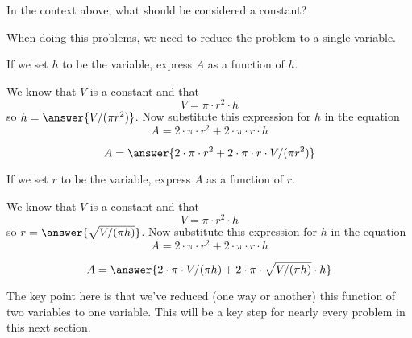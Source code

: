 \documentclass{ximera}
\begin{document}
\begin{problem}
  In the context above, what should be considered a constant?
  \begin{multipleChoice}
  \end{multipleChoice}
\end{problem}

When doing this problems, we need to reduce the problem to a single
variable.

\begin{problem}
  If we set $h$ to be the variable, express $A$ as a function of $h$.
  \begin{hint}
    We know that $V$ is a constant and that
    \[
    V = \pi \cdot r^2 \cdot h
    \]
    so $h=\answer{V/(\pi r^2)}$.
    Now substitute this expression for $h$ in the equation
    \[
  A = 2\cdot \pi \cdot r^2 + 2\cdot\pi \cdot r \cdot h
    \]
  \end{hint}
  \begin{prompt}
    \[
    A = \answer{2\cdot \pi \cdot r^2 + 2\cdot\pi \cdot r\cdot V/(\pi r^2)}
    \]
  \end{prompt}
\end{problem}

\begin{problem}
  If we set $r$ to be the variable, express $A$ as a function of $r$.
  \begin{hint}
    We know that $V$ is a constant and that
    \[
    V = \pi \cdot r^2 \cdot h
    \]
    so $r=\answer{\sqrt{V/(\pi h)}}$.
    Now substitute this expression for $h$ in the equation
    \[
    A = 2\cdot \pi \cdot r^2 + 2\cdot\pi \cdot r \cdot h
    \]
  \end{hint}
  \begin{prompt}
    \[
    A = \answer{2\cdot \pi \cdot V/(\pi h) + 2\cdot\pi \cdot \sqrt{V/(\pi h)} \cdot h}
    \]
  \end{prompt}
\end{problem}

The key point here is that we've reduced (one way or another) this
function of two variables to one variable. This will be a key step for
nearly every problem in this next section.


\end{document}
